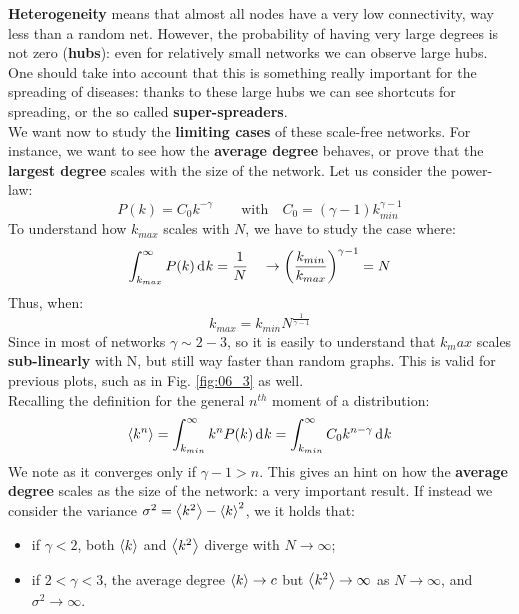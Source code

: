 \documentclass[../main/main.tex]{subfiles}
\begin{document}
\textbf{Heterogeneity} means that almost all nodes have a very low connectivity, way less than a random net. However, the probability of having very large degrees is not zero (\textbf{hubs}): even for relatively small networks we can observe large hubs. One should take into account that this is something really important for the spreading of diseases: thanks to these large hubs we can see shortcuts for spreading, or the so called \textbf{super-spreaders}.\\

We want now to study the \textbf{limiting cases} of these scale-free networks. For instance, we want to see how the \textbf{average degree} behaves, or prove that the \textbf{largest degree} scales with the size of the network. Let us consider the power-law:
\begin{equation}
  P(k) = C_0 k^{-\gamma } \qquad \text{with} \quad C_0 = (\gamma -1  ) k_{min}^{\gamma -1 }
\end{equation}
To understand how \( k_{max} \) scales with \( N \), we have to study the case where:
\begin{equation*}
  \int_{k_{max}}^{\infty } P(k) \dd[]{k}  = \frac{1}{N} \quad \rightarrow  \qty(\frac{k_{min}}{k_{max}})^{\gamma -1 } = N
\end{equation*}
Thus, when:
\begin{equation}
  k_{max} = k_{min} N^{\frac{1}{\gamma -1 }}
\end{equation}
Since in most of networks \( \gamma \sim 2-3  \), so it is easily to understand that $k_max$ scales \textbf{sub-linearly} with N, but still way faster than random graphs. This is valid for previous plots, such as in Fig. \ref{fig:06_3} as well.\\
Recalling the definition for the general \( n^{th} \) moment of a distribution: 
\begin{equation}
  \expval{k^n} = \int_{k_{min}}^{\infty } k^n P(k) \dd[]{k} = \int_{k_{min}}^{\infty }  C_0 k^{n- \gamma  }\dd[]{k}
\end{equation}
We note as it converges only if \( \gamma -1 > n  \). This gives an hint on how the \textbf{average degree} scales as the size of the network: a very important result. If instead we consider the variance \( \sigma ^2  = \expval{k^2} - \expval{k}^2  \), we it holds that:
\begin{itemize}
\item if \( \gamma <2  \), both \( \expval{k}  \) and \( \expval{k^2}  \) diverge with \( N \rightarrow  \infty  \);

\item if \( 2 < \gamma < 3  \), the average degree \( \expval{k}  \rightarrow c \) but \( \expval{k^2}  \rightarrow \infty \) as \( N \rightarrow  \infty  \), and \( \sigma ^2 \rightarrow \infty  \).
\end{itemize}
\end{document}
